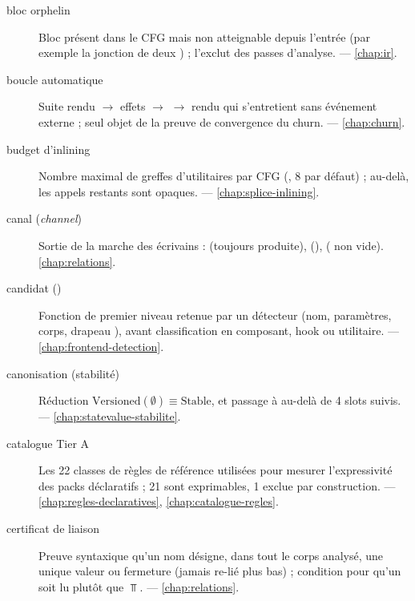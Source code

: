 \begin{description}
\item[bloc orphelin] Bloc présent dans le CFG mais non atteignable depuis l'entrée (par exemple la jonction de deux ) ;  l'exclut des passes d'analyse.  — \cref{chap:ir}.

\item[boucle automatique] Suite rendu \(\to\) effets \(\to\)  \(\to\) rendu qui s'entretient sans événement externe ; seul objet de la preuve de convergence du churn.  — \cref{chap:churn}.

\item[budget d'inlining] Nombre maximal de greffes d'utilitaires par CFG (, 8 par défaut) ; au-delà, les appels restants sont opaques.  — \cref{chap:splice-inlining}.

\item[canal (\emph{channel})] Sortie de la marche des écrivains :  (toujours produite),  (),  ( non vide). \cref{chap:relations}.

\item[candidat ()] Fonction de premier niveau retenue par un détecteur (nom, paramètres, corps, drapeau ), avant classification en composant, hook ou utilitaire.  — \cref{chap:frontend-detection}.

\item[canonisation (stabilité)] Réduction \(\text{Versioned}(\emptyset) \equiv \text{Stable}\), et passage à  au-delà de 4 slots suivis.  — \cref{chap:statevalue-stabilite}.

\item[catalogue Tier A] Les 22 classes de règles de référence utilisées pour mesurer l'expressivité des packs déclaratifs ; 21 sont exprimables, 1 exclue par construction.  — \cref{chap:regles-declaratives}, \cref{chap:catalogue-regles}.

\item[certificat de liaison] Preuve syntaxique qu'un nom désigne, dans tout le corps analysé, une unique valeur ou fermeture (jamais re-lié plus bas) ; condition pour qu'un  soit lu  plutôt que \(\Top\).  — \cref{chap:relations}.


\end{description}
